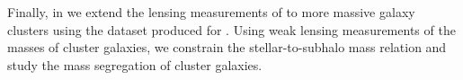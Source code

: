 Finally, in  we extend the lensing measurements of  to more massive galaxy clusters using the dataset produced for . Using weak lensing measurements of the masses of cluster galaxies, we constrain the stellar-to-subhalo mass relation and study the mass segregation of cluster galaxies.


% 
